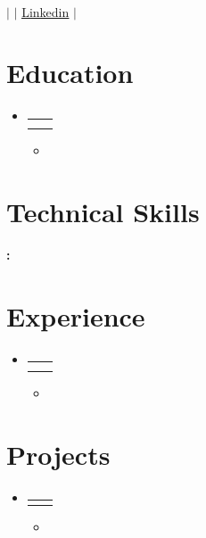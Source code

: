 \documentclass[letterpaper,11pt]{article}
\makeatletter
\newcommand{\resumeItem}[1]{
  \item\small{
    {#1 \vspace{-2pt}}
  }
}
\newcommand{\resumeSubheading}[4]{
  \vspace{-2pt}\item
    \begin{tabular*}{0.97\textwidth}[t]{l@{\extracolsep{\fill}}r}
      \textbf{#1} & #2 \\
      \textit{\small#3} & \textit{\small #4} \\
    \end{tabular*}\vspace{-7pt}
}
\newcommand{\resumeProjectHeading}[2]{
    \item
    \begin{tabular*}{0.97\textwidth}{l@{\extracolsep{\fill}}r}
      \small#1 & #2 \\
    \end{tabular*}\vspace{-7pt}
}
\newcommand{\resumeSubHeadingListStart}{\begin{itemize}[leftmargin=0.15in, label={}]}
\newcommand{\resumeSubHeadingListEnd}{\end{itemize}}
\newcommand{\resumeItemListStart}{\begin{itemize}}
\newcommand{\resumeItemListEnd}{\end{itemize}\vspace{-5pt}}
\makeatother
\begin{document}

\begin{center}
    \textbf{\huge {}} \\ \vspace{1pt}
    \small {} $|$ \href{mailto:\VAR{meta.email}}{\underline{}} $|$
    \href{\VAR{meta.linkedin}}{\underline{Linkedin}} $|$
    \href{\VAR{meta.website}}{\underline{}}
\end{center}


\section{Education}
  \resumeSubHeadingListStart
    \resumeSubheading
      {\VAR{edu.institution}}{\VAR{edu.location}}
      {\VAR{edu.degree}}{\VAR{edu.dates}}
    \resumeItemListStart
        \resumeItem{}
    \resumeItemListEnd
  \resumeSubHeadingListEnd


\section{Technical Skills}
 \begin{itemize}[leftmargin=0.15in, label={}]
    \small{\item{
    \textbf{:} {}\\
    }}
 \end{itemize}


\section{Experience}
  \resumeSubHeadingListStart
    \resumeSubheading
      {\VAR{exp.title}}{\VAR{exp.dates}}
      {\VAR{exp.company}}{\VAR{exp.location}}
      \resumeItemListStart
        \resumeItem{}
      \resumeItemListEnd
  \resumeSubHeadingListEnd


\section{Projects}
    \resumeSubHeadingListStart
    \resumeProjectHeading
          {\textbf{\VAR{proj.name}}}{}
        \resumeItemListStart
            \resumeItem{}
        \resumeItemListEnd
    \resumeSubHeadingListEnd
\end{document}
